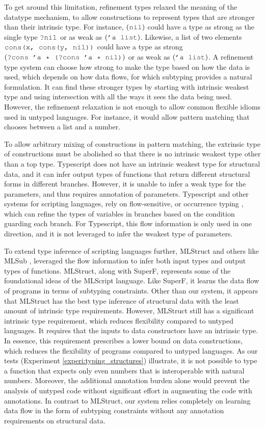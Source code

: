 \documentclass[acmsmall]{acmart}
\theoremstyle{definition}
\begin{document}
To get around this limitation, refinement types \cite{} relaxed the meaning of the datatype mechanism, to 
allow constructions to represent types that are stronger than their intrinsic type.
For instance, $(\J{nil})$ could have a type as strong as the single type $\J{?nil}$ or as weak as $(\J{'a list})$.
Likewise, a list of two elements $\J{cons(x, cons(y, nil))}$ could have a type as strong $(\J{?cons 'a * (?cons 'a * nil)})$
or as weak as $(\J{'a list})$. A refinement type system can choose how strong to make the type based on how the data is used, 
which depends on how data flows, for which subtyping provides a natural formulation. 
It can find these stronger types by starting with intrinsic weakest type and using intersection with 
all the ways it sees the data being used.
However, the refinement relaxation is not enough to allow common flexible idioms used in untyped languages. 
For instance, it would allow pattern matching that chooses between a list and a number.

To allow arbitrary mixing of constructions in pattern matching, the extrinsic type of constructions
must be abolished so that there is no intrinsic weakest type other than a top type. 
Typescript \cite{} does not have an intrinsic weakest type for structural data,
and it can infer output types of functions that return different structural forms in different branches.
However, it is unable to infer a weak type for the parameters, and thus requires annotation of parameters.  
Typescript and other systems for scripting languages, rely on flow-sensitive, or occurrence typing \cite{},
which can refine the types of variables in branches based on the condition guarding each branch.
For Typescript, this flow information is only used in one direction, and it is not leveraged to infer
the weakest type of parameters.

To extend type inference of scripting languages further, MLStruct \cite{} and others like MLSub \cite{}, 
leveraged the flow information to infer both input types and output types of functions.
MLStruct, along with SuperF, represents some of the foundational ideas of the MLScript language.
Like SuperF, it learns the data flow of programs in terms of subtyping constraints.
Other than our system, it appears that MLStruct has the best type inference of structural data
with the least amount of intrinsic type requirements. 
However, MLStruct still has a significant intrinsic type requirement, which reduces flexibility compared
to untyped languages. It requires that the inputs to data constructors have an intrinsic type.  
In essence, this requirement prescribes a lower bound on data constructions,
which reduces the flexibility of programs compared to untyped languages. 
As our tests (Experiment \ref{experi:typing_structures})
illustrate, it is not possible to type a function that expects only even numbers that is interoperable with natural numbers.
Moreover, the additional annotation burden alone would prevent the analysis of untyped code without
significant effort in augmenting the code with annotations.
In contrast to MLStruct, our system relies completely on learning data flow in the form of subtyping constraints
without any annotation requirements on structural data. 
\end{document}
